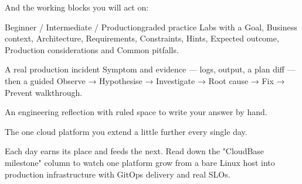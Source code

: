 \smallskip And the working blocks you will act on:

\begin{minilab}{Beginner / Intermediate / Production}{graded practice}
Labs with a Goal, Business context, Architecture, Requirements, Constraints, Hints, Expected outcome,
Production considerations and Common pitfalls.
\end{minilab}
\begin{debuglab}{A real production incident}
Symptom and evidence --- logs,  output, a plan diff --- then a guided
Observe → Hypothesise → Investigate → Root cause → Fix → Prevent walkthrough.
\end{debuglab}
\begin{thinkbox}
An engineering reflection with ruled space to write your answer by hand.
\end{thinkbox}
\begin{buildalong}[CloudBase]
The one cloud platform you extend a little further every single day.
\end{buildalong}


Each day earns its place and feeds the next. Read down the "CloudBase milestone" column to watch one
platform grow from a bare Linux host into production infrastructure with GitOps delivery and real SLOs.

